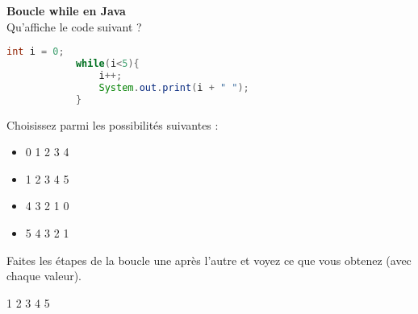     
    \begin{Exercice}[5 minutes] \textbf{Boucle while en Java}\\
      	Qu'affiche le code suivant ?
      	
      	\begin{lstlisting}[language=Java]
            int i = 0;
            while(i<5){
            	i++;
            	System.out.print(i + " ");
            }
     	\end{lstlisting}
             	
        Choisissez parmi les possibilités suivantes :
        
        \begin{itemize}
        
        \item 0 
        1 
        2 
        3 
        4 
        \item 1  
        2 
        3 
        4 
        5 
        \item 4 
        3 
        2 
        1 
        0 
        \item 5 
        4 
        3 
        2 
        1
        \end{itemize}
    
        \begin{conseil}
		   Faites les étapes de la boucle une après l'autre et voyez ce que vous obtenez (avec chaque valeur).  
        \end{conseil}
        
        \begin{solution}
            1 
            2 
            3 
            4 
            5
        \end{solution}
    \end{Exercice} 
	
